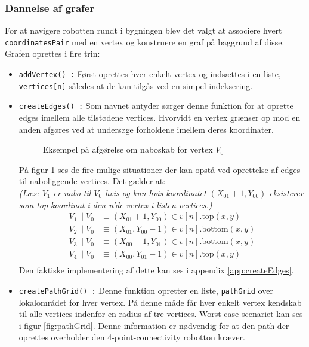 \subsubsection{Dannelse af grafer}
For at navigere robotten rundt i bygningen blev det valgt at associere hvert \texttt{coordinatesPair} med en vertex og konstruere en graf på baggrund af disse. Grafen oprettes i fire trin:
\begin{itemize}
	\item \texttt{addVertex() :} Først oprettes hver enkelt vertex og indsættes i en liste, \texttt{vertices[n]} således at de kan tilgås ved en simpel indeksering.
	\item \texttt{createEdges() :} Som navnet antyder sørger denne funktion for at oprette edges imellem alle tilstødene vertices. Hvorvidt en vertex grænser op mod en anden afgøres ved at undersøge forholdene imellem deres koordinater. 
\begin{figure}[h!]
	\label{fig:coordRelation}
	\caption{Eksempel på afgørelse om naboskab for vertex $V_0$}
\end{figure}
På figur \ref{fig:coordRelation} ses de fire mulige situationer der kan opstå ved oprettelse af edges til naboliggende vertices. Det gælder at: \\
\scriptsize\emph{(Læs: $V_1$ er nabo til $V_0$ hvis og kun hvis koordinatet $(X_{01}+1,Y_{00})$ eksisterer som top koordinat i den n'de vertex i listen vertices.)}
\normalsize	 	 
	 \begin{align*}
	 V_1\parallel V_0 & \equiv(X_{01}+1,Y_{00})\in v[n].\text{top}(x,y)	 \\
	 V_2\parallel V_0 & \equiv(X_{01},Y_{00}-1)\in v[n].\text{bottom}(x,y)\\
	 V_3\parallel V_0 & \equiv(X_{00}-1,Y_{01})\in v[n].\text{bottom}(x,y)\\
	 V_4\parallel V_0 & \equiv(X_{00},Y_{01}-1)\in v[n].\text{top}(x,y)\\
	 \end{align*}
Den faktiske implementering af dette kan ses i appendix \ref{app:createEdges}.
	 \item \texttt{createPathGrid() :} Denne funktion opretter en liste, \texttt{pathGrid} over lokalområdet for hver vertex. På denne måde får hver enkelt vertex kendskab til alle vertices indenfor en radius af tre vertices. Worst-case scenariet kan ses i figur \ref{fig:pathGrid}. Denne information er nødvendig for at den path der oprettes overholder den 4-point-connectivity robotton kræver. 

\end{itemize}
